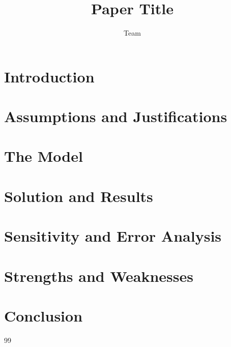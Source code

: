 \documentclass[11pt,letterpaper]{article}
\title{Paper Title}
\author{Team}
\date{}
\begin{document}
\maketitle
\begin{abstract}
\end{abstract}
\section{Introduction}
\section{Assumptions and Justifications}
\section{The Model}
\section{Solution and Results}
\section{Sensitivity and Error Analysis}
\section{Strengths and Weaknesses}
\section{Conclusion}
\begin{thebibliography}{99}
\end{thebibliography}
\end{document}
